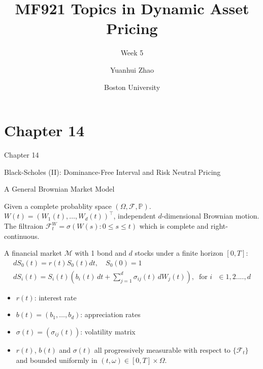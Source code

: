 \documentclass{beamer}
\title{MF921 Topics in Dynamic Asset Pricing}
\subtitle{Week 5}
\author{Yuanhui Zhao}
\date{Boston University}
\begin{document}
\frame{\titlepage}

\section{Chapter 14}
\begin{frame}{Chapter 14}

    \begin{center}
        \par Black-Scholes (II): Dominance-Free Interval and Risk Neutral Pricing
    \end{center}
    
\end{frame}

\begin{frame}{A General Brownian Market Model}

    {\footnotesize \footnotesize
    \par Given a complete probablity space \( (\Omega, \mathcal{F}, \mathbb{P}) \).
    \( W(t) = (W_1(t), \ldots, W_d(t))^\top \), independent \( d \)-dimensional Brownian motion. The filtraion 
    $\mathcal{F}_t^W = \sigma(W(s) : 0 \leq s \leq t)$ which is complete and right-continuous.
    \vspace{1em} 
    \par A financial market $\mathcal{M}$ with 1 bond and $d$ stocks under a finite horizon $[0,T]$:
    \begin{gather*}
    dS_0(t) = r(t)S_0(t)  dt, \quad S_0(0) = 1 \\
    dS_i(t) = S_i(t)\left(b_i(t)\,dt + \sum_{j=1}^d \sigma_{ij}(t)\,dW_j(t)\right),\;\;\text{for $i$ $\in 1,2....,d$}
    \end{gather*}
     \pause 
    \begin{itemize}
        \item \( r(t) \): interest rate
        \item  \( b(t) = (b_1, \ldots, b_d) \): appreciation rates
        \item \( \sigma(t) = (\sigma_{ij}(t)) \): volatility matrix
        \item \( r(t) \), \(b(t) \) and \( \sigma(t)\) all progressively measurable
         with respect to $\{\mathcal{F}_t\}$ and bounded uniformly in $(t,\omega) \in [0,T] \times \Omega$.
    \end{itemize}
    }   
\end{frame}
\end{document}
